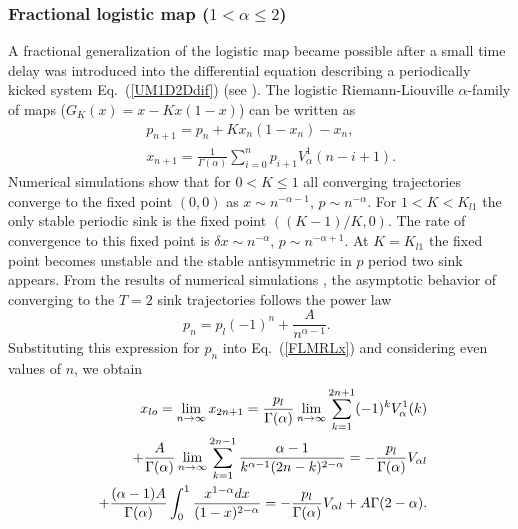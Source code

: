 \documentclass[graybox]{svmult}
\begin{document}
\subsubsection{Fractional logistic map ($1 < \alpha \le2$)}
\label{alp1_2LSM}

A fractional generalization of the logistic map became possible after a small time delay was introduced into the differential equation describing a periodically kicked system Eq.~(\ref{UM1D2Ddif}) (see \cite{ME4}). The logistic Riemann-Liouville $\alpha$-family of maps ($G_K(x)=x-Kx(1-x)$) can be written as
{\setlength\arraycolsep{0.5pt}
\begin{eqnarray}
\label{FLMRLp}
&&p_{n+1} = p_n + K x_n (1-x_n)-x_n ,  \\
&&x_{n+1} = \frac{1}{\Gamma (\alpha )} 
\sum_{i=0}^{n} p_{i+1}V^1_{\alpha}(n-i+1).
\label{FLMRLx}
\end{eqnarray}
}
Numerical simulations show that for $0<K \le 1$ all converging trajectories converge to the fixed point $(0,0)$ as 
$x \sim n^{-\alpha -1}$, $p \sim n^{-\alpha}$. For $1<K<K_{l1}$ 
the only stable periodic sink is the fixed point $((K-1)/K,0)$. The rate of convergence to this fixed point is  $\delta x \sim n^{-\alpha}$, $p \sim n^{-\alpha+1}$.
At $K=K_{l1}$ the fixed point becomes unstable and the stable antisymmetric in $p$  period two sink appears. 
From the results of numerical simulations \cite{ME4}, the asymptotic behavior of converging to the $T=2$ sink trajectories follows the power law
\begin{equation} \label{P2Asy} 
p_n=p_l(-1)^n+ \frac{A}{n^{\alpha -1}} .\ \  
\end{equation}
Substituting this expression for $p_n$ into Eq.~(\ref{FLMRLx}) and considering even values of $n$, we obtain
{\setlength\arraycolsep{0.5pt}
\begin{eqnarray}
&&x_{lo}=\lim_{n \rightarrow \infty}x_{2n+1}=\frac{p_l}{\Gamma(\alpha)} 
\lim_{n \rightarrow \infty}\sum^{2n+1}_{k=1}(-1)^k V_{\alpha}^1(k) \nonumber \\ 
&&\hspace{-0.2cm}+\frac{A}{\Gamma(\alpha)}\lim_{n \rightarrow \infty}
\sum^{2n-1}_{k=1}\frac{\alpha-1}{k^{\alpha-1}(2n-k)^{2-\alpha}}=
-\frac{p_l}{\Gamma(\alpha)}V_{\alpha l}  
\label{limxo} \\
&&\hspace{-0.2cm}+\frac{(\alpha-1)A}{\Gamma(\alpha)} \int^{1}_0
\frac{x^{1-\alpha} dx}{(1-x)^{2-\alpha}}
=-\frac{p_l}{\Gamma(\alpha)}V_{\alpha l}+A \Gamma(2-\alpha). \nonumber
\end{eqnarray}
}
\end{document}
